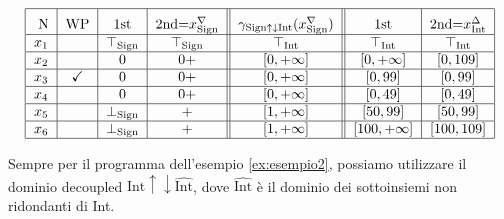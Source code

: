 \begin{example}
\begin{table}[H]
\begin{minipage}{\textwidth}
\[\begin{tabular}{|c|c|c|c||c||c|c|c||}
        \hline 
        \rule{0pt}{14pt} N & WP & 1st & 2nd=\(x^{\nabla}_{\textrm{Sign}}\) & 
        \(\gamma_{\textrm{Sign}\uparrow\downarrow\textrm{Int}}(x^{\nabla}_{\textrm{Sign}})\)& 
        1st & 2nd=\(x^{\Delta}_{\textrm{Int}}\)  \\
        \hline
        $x_1$ &  &  
            $\top_{\textrm{Sign}}$ & $\top_{\textrm{Sign}}$ & 
            $\top_{\textrm{Int}}$ & 
            $\top_{\textrm{Int}}$ & $\top_{\textrm{Int}}$ \\
        \hline
        $x_2$ &  & 
            0 & 0+ & 
            $\left[0, +\infty \right]$ & 
            $\left[0, +\infty \right]$ & $\left[0, 109\right]$ \\
        \hline
        $x_3$ & \checkmark & 
            0 & 0+ & 
            $\left[0, +\infty \right]$ & 
            $\left[0, 99\right]$ & $\left[0, 99\right]$ \\
        \hline
        $x_4$ &  & 
            0 & 0+ & 
            $\left[0, +\infty\right]$ & 
            $\left[0, 49\right]$ & $\left[0, 49\right]$ \\
        \hline
        $x_5$ &  & 
            $\perp_{\textrm{Sign}}$ & + & 
            $\left[1, +\infty \right]$ & 
            $\left[50, 99\right]$ & $\left[50, 99\right]$ \\
        \hline
        $x_6$ &  & 
            $\perp_{\textrm{Sign}}$ & + & 
            $\left[1, +\infty \right]$ & 
            $\left[100, +\infty \right]$ & $\left[100, 109\right]$ \\
        \hline
        \end{tabular}
        \]
    \end{minipage}
    \caption{tabella dei risultati del dominio \(\textrm{Sign}\uparrow\downarrow\textrm{Int}\) divisi per step e fase.}
    \label{fig:risDecSingInt}
\end{table}
\end{example}

\begin{example}
Sempre per il programma dell'esempio \ref{ex:esempio2}, possiamo utilizzare il dominio decoupled \(\textrm{Int}\uparrow\downarrow\widehat{\textrm{Int}}\), dove \(\widehat{\textrm{Int}}\) è il dominio dei sottoinsiemi non ridondanti di Int.
\end{example}